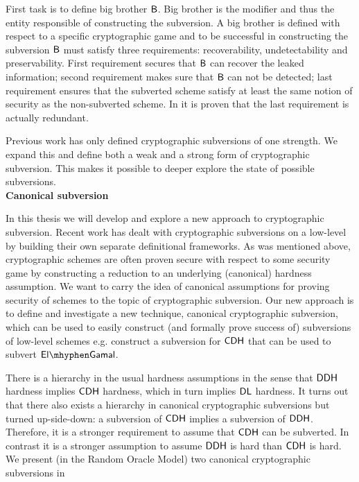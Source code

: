 First task is to define big brother $\mathsf{B}$. Big brother is the modifier and thus the entity responsible of constructing the subversion. A big brother is defined with respect to a specific cryptographic game and to be successful in constructing the subversion $\mathsf{B}$ must satisfy three requirements: recoverability, undetectability and preservability. First requirement secures that $\mathsf{B}$ can recover the leaked information; second requirement makes sure that $\mathsf{B}$ can not be detected; last requirement ensures that the subverted scheme satisfy at least the same notion of security as the non-subverted scheme. In  it is proven that the last requirement is actually redundant. 

Previous work has only defined cryptographic subversions of one strength. We expand this and define both a weak and a strong form of cryptographic subversion. This makes it possible to deeper explore the state of possible subversions. \\

\noindent\textbf{Canonical subversion}

In this thesis we will develop and explore a new approach to cryptographic subversion. Recent work \cite{cryptoeprint:2015:517,DBLP:conf/eurocrypt/DodisGGJR15,DBLP:secSym,cryptoeprint:2015:683} has dealt with cryptographic subversions on a low-level by building their own separate definitional frameworks. As was mentioned above, cryptographic schemes are often proven secure with respect to some security game by constructing a reduction to an underlying (canonical) hardness assumption. We want to carry the idea of canonical assumptions for proving security of schemes to the topic of cryptographic subversion.
Our new approach is to define and investigate a new technique, canonical cryptographic subversion, which can be used to easily construct (and formally prove success of) subversions of low-level schemes e.g. construct a subversion for $\mathsf{CDH}$ that can be used to subvert $\elGamal$.

There is a hierarchy in the usual hardness assumptions in the sense that $\mathsf{DDH}$ hardness implies $\mathsf{CDH}$ hardness, which in turn implies $\mathsf{DL}$ hardness. It turns out that there also exists a hierarchy in canonical cryptographic subversions but turned up-side-down: a subversion of $\mathsf{CDH}$ implies a subversion of $\mathsf{DDH}$. Therefore, it is a stronger requirement to assume that $\mathsf{CDH}$ can be subverted. In contrast it is a stronger assumption to assume $\mathsf{DDH}$ is hard than $\mathsf{CDH}$ is hard. We present (in the Random Oracle Model) two canonical cryptographic subversions in  \\

